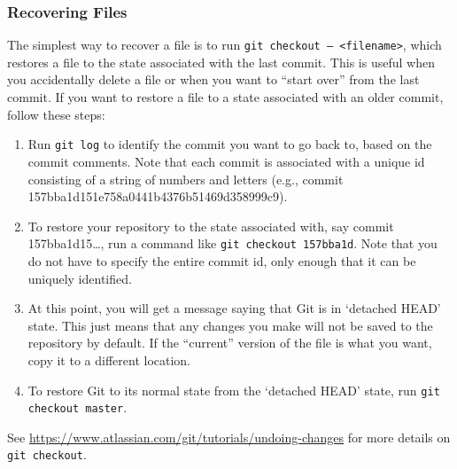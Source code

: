 \documentclass[12pt]{article}
\begin{document}
\subsubsection{Recovering Files}
The simplest way to recover a file is to run \texttt{git checkout -- <filename>}, which restores a file to the state associated with the last commit. This is useful when you accidentally delete a file or when you want to ``start over'' from the last commit. If you want to restore a file to a state associated with an older commit, follow these steps:
\begin{enumerate}
    \item Run \texttt{git log} to identify the commit you want to go back to, based on the commit comments. Note that each commit is associated with a unique id consisting of a string of numbers and letters (e.g., commit 157bba1d151e758a0441b4376b51469d358999c9).
    \item To restore your repository to the state associated with, say commit 157bba1d15\dots, run a command like \texttt{git checkout 157bba1d}. Note that you do not have to specify the entire commit id, only enough that it can be uniquely identified.
    \item At this point, you will get a message saying that Git is in `detached HEAD' state. This just means that any changes you make will not be saved to the repository by default. If the ``current'' version of the file is what you want, copy it to a different location.
    \item To restore Git to its normal state from the `detached HEAD' state, run \texttt{git checkout master}.
\end{enumerate}
See \url{https://www.atlassian.com/git/tutorials/undoing-changes} for more details on \texttt{git checkout}.
\end{document}
